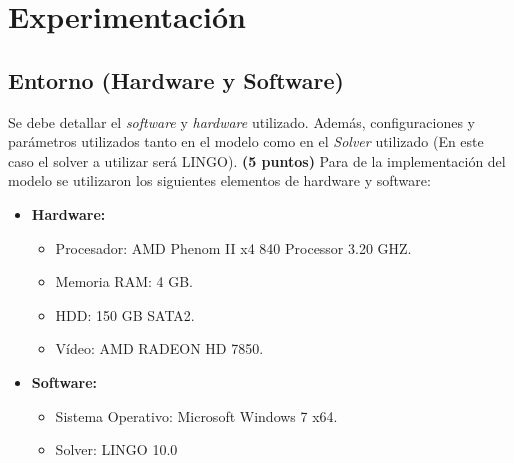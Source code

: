 \documentclass[journal, 10pt]{IEEEtran}
\begin{document}
\section{Experimentación}
\subsection{Entorno (Hardware y Software)}
Se debe detallar el \textit{software} y \textit{hardware} utilizado. Además, configuraciones y parámetros utilizados tanto en el modelo como en el \textit{Solver} utilizado (En este caso el solver a utilizar será LINGO). \textbf{(5 puntos)}
Para de la implementación del modelo se utilizaron los siguientes elementos de hardware y software:
\begin{itemize}
	\item \textbf{Hardware:} 
		\begin{itemize}
			\item Procesador: AMD Phenom II x4 840 Processor 3.20 GHZ.
			\item Memoria RAM: 4 GB.
			\item HDD: 150 GB SATA2.	
			\item Vídeo: AMD RADEON HD 7850.
		\end{itemize}
	\item \textbf{Software:}
		\begin{itemize}
			\item Sistema Operativo: Microsoft Windows 7 x64.
			\item Solver: LINGO 10.0
		\end{itemize}
\end{itemize}
\end{document}
